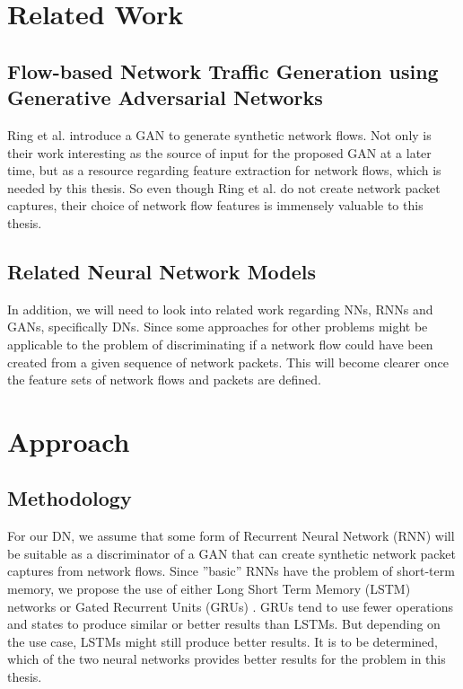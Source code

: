 \documentclass[
	ngerman,
	ruledheaders=section,%
	class=report,%
	thesis={type=bachelor},%
	accentcolor=9c,%
	custommargins=true,%
	marginpar=false,%
	parskip=half-,%
	fontsize=11pt,%
]{tudapub}
\begin{document}
\chapter{Related Work}

\section{Flow-based Network Traffic Generation using Generative Adversarial Networks}

Ring et al. \cite{ringFlowbasedNetworkTraffic2019a} introduce a GAN to generate synthetic network flows.
Not only is their work interesting as the source of input for the proposed GAN at a later time,
but as a resource regarding feature extraction for network flows,
which is needed by this thesis.
So even though Ring et al. \cite{ringFlowbasedNetworkTraffic2019a} do not create network packet captures,
their choice of network flow features is immensely valuable to this thesis.

\section{Related Neural Network Models}

In addition, we will need to look into related work regarding NNs, RNNs and GANs, specifically DNs.
Since some approaches for other problems might be applicable to the problem of discriminating if a network flow could have been created from a given sequence of network packets.
This will become clearer once the feature sets of network flows and packets are defined.




\chapter{Approach}

\section{Methodology}

For our DN, we assume that some form of Recurrent Neural Network (RNN) will be suitable as a discriminator of a GAN that can create synthetic network packet captures from network flows.
Since ''basic'' RNNs have the problem of short-term memory, we propose the use of either Long Short Term Memory (LSTM) networks \cite{hochreiterLongShortTermMemory1997} or Gated Recurrent Units (GRUs) \cite{bahdanauNeuralMachineTranslation2016}.
GRUs tend to use fewer operations and states to produce similar or better results than LSTMs.
But depending on the use case, LSTMs might still produce better results.
It is to be determined, which of the two neural networks provides better results for the problem in this thesis.
\end{document}
